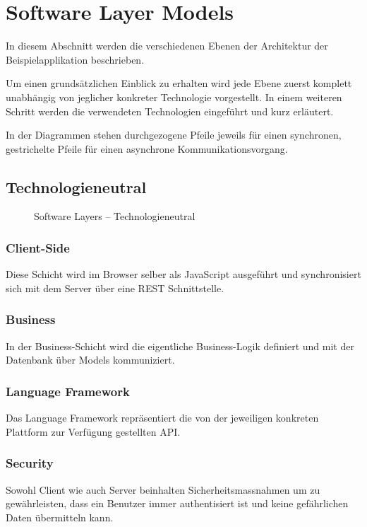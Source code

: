 \section{Software Layer Models}

In diesem Abschnitt werden die verschiedenen Ebenen der Architektur der Beispielapplikation beschrieben.

Um einen grundsätzlichen Einblick zu erhalten wird jede Ebene zuerst komplett unabhängig von jeglicher konkreter Technologie vorgestellt. In einem weiteren Schritt werden die verwendeten Technologien eingeführt und kurz erläutert.

In der Diagrammen stehen durchgezogene Pfeile jeweils für einen synchronen, gestrichelte Pfeile für einen asynchrone Kommunikationsvorgang.


\subsection*{Technologieneutral}

\begin{figure}[H]
	\centering{
		
	}

	\caption{Software Layers -- Technologieneutral}
\end{figure}

\subsubsection*{Client-Side}
Diese Schicht wird im Browser selber als JavaScript ausgeführt und synchronisiert sich mit dem Server über eine REST Schnittstelle.

\subsubsection*{Business}
In der Business-Schicht wird die eigentliche Business-Logik definiert und mit der Datenbank über Models kommuniziert.

\subsubsection*{Language Framework}
Das Language Framework repräsentiert die von der jeweiligen konkreten Plattform zur Verfügung gestellten API.

\subsubsection*{Security}
Sowohl Client wie auch Server beinhalten Sicherheitsmassnahmen um zu gewährleisten, dass ein \gls{Benutzer} immer authentisiert ist und keine gefährlichen Daten übermitteln kann.

